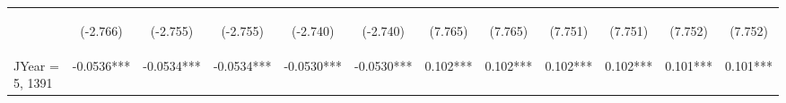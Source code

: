 \documentclass[]{article}
\begin{document}
\begin{center}
\begin{tabular}{lccccccccccc}
        \vspace{4pt}     & \begin{footnotesize}(-2.766)\end{footnotesize} & \begin{footnotesize}(-2.755)\end{footnotesize} & \begin{footnotesize}(-2.755)\end{footnotesize} & \begin{footnotesize}(-2.740)\end{footnotesize} & \begin{footnotesize}(-2.740)\end{footnotesize} & \begin{footnotesize}(7.765)\end{footnotesize}   & \begin{footnotesize}(7.765)\end{footnotesize}   & \begin{footnotesize}(7.751)\end{footnotesize}  & \begin{footnotesize}(7.751)\end{footnotesize}  & \begin{footnotesize}(7.752)\end{footnotesize}  & \begin{footnotesize}(7.752)\end{footnotesize}  \\
        JYear = 5, 1391  & -0.0536***                                     & -0.0534***                                     & -0.0534***                                     & -0.0530***                                     & -0.0530***                                     & 0.102***                                        & 0.102***                                        & 0.102***                                       & 0.102***                                       & 0.101***                                       & 0.101***                                       \\

\end{tabular}
\end{center}
\end{document}
